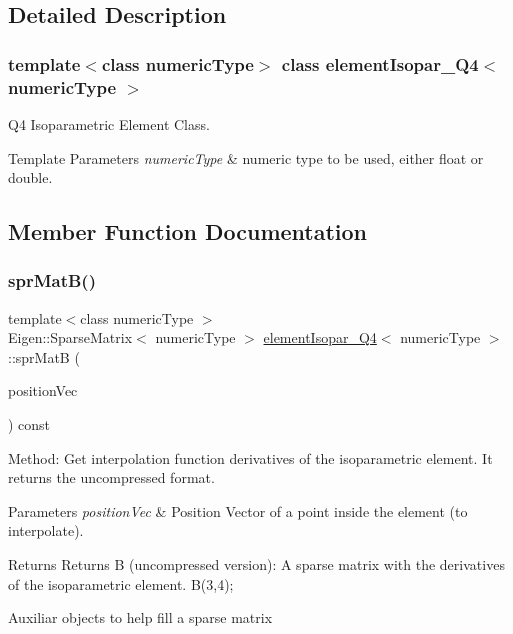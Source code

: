 \subsection{Detailed Description}
\subsubsection*{template$<$class numeric\+Type$>$\newline
class element\+Isopar\+\_\+\+Q4$<$ numeric\+Type $>$}

Q4 Isoparametric Element Class. 
\begin{DoxyTemplParams}{Template Parameters}
{\em numeric\+Type} & numeric type to be used, either float or double. \\
\hline
\end{DoxyTemplParams}


\subsection{Member Function Documentation}
\mbox{\label{classelement_isopar___q4_a31ed84f904a48d20dac99efe4137d2b2}} 
\subsubsection{\texorpdfstring{spr\+Mat\+B()}{sprMatB()}}
{\footnotesize\ttfamily template$<$class numeric\+Type $>$ \\
Eigen\+::\+Sparse\+Matrix$<$ numeric\+Type $>$ \mbox{\hyperlink{classelement_isopar___q4}{element\+Isopar\+\_\+\+Q4}}$<$ numeric\+Type $>$\+::spr\+MatB (\begin{DoxyParamCaption}\item[{const Matrix$<$ numeric\+Type, 2, 1 $>$ \&}]{position\+Vec }\end{DoxyParamCaption}) const}

Method\+: Get interpolation function derivatives of the isoparametric element. It returns the uncompressed format. 
\begin{DoxyParams}{Parameters}
{\em position\+Vec} & Position Vector of a point inside the element (to interpolate). \\
\hline
\end{DoxyParams}
\begin{DoxyReturn}{Returns}
Returns B (uncompressed version)\+: A sparse matrix with the derivatives of the isoparametric element. B(3,4); 
\end{DoxyReturn}
Auxiliar objects to help fill a sparse matrix

